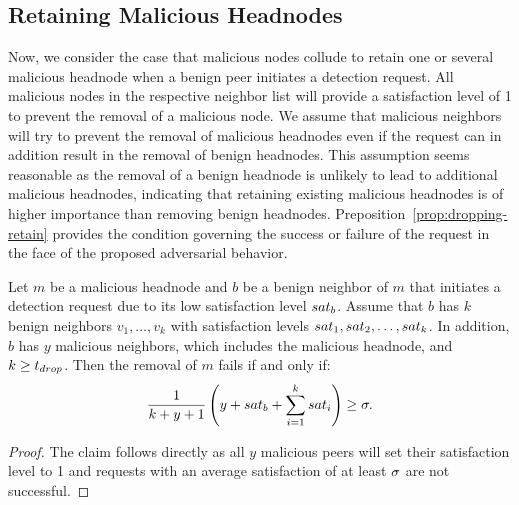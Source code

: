 \subsection{Retaining Malicious Headnodes}
Now, we consider the case that malicious nodes collude to retain one or several malicious headnode when a benign peer initiates a detection request. 
All malicious nodes in the respective neighbor list will provide a satisfaction level of 1 to prevent the removal of a malicious node. We assume that malicious neighbors will try to prevent the removal of malicious headnodes even if the request can in addition result in the removal of benign headnodes. This assumption seems reasonable as the removal of a benign headnode is unlikely to lead to additional malicious headnodes, indicating that retaining existing malicious headnodes is of higher importance than removing benign headnodes.  Preposition~\ref{prop:dropping-retain} provides the condition governing the success or failure of the \drop request in the face of the proposed adversarial behavior. 

\begin{proposition}
\label{prop:dropping-retain}
Let $m$ be a malicious headnode and $b$ be a benign neighbor of $m$ that initiates a detection request due to its low satisfaction level $sat_b$.
Assume that $b$ has $k$ benign neighbors $v_1, \ldots , v_k$ with satisfaction levels $sat_1, sat_2 ,\ldots  , sat_k$. In addition, $b$ has $y$ malicious neighbors, which includes the malicious headnode, and $k\geq t_{drop}$.
 Then the removal of $m$ fails if and only if: 
\begin{align}
\label{eq:drop-retain}
\frac{1}{k+y+1}\left(y+\sat_b + \sum_{i=1}^k \sat_i\right) \geq \satThres.  
\end{align} 
\end{proposition}
\begin{proof}
The claim follows directly as all $y$ malicious peers will set their satisfaction level to 1 and \drop requests with an average satisfaction of at least $\sigma$ are not successful.   
\end{proof}


 
 